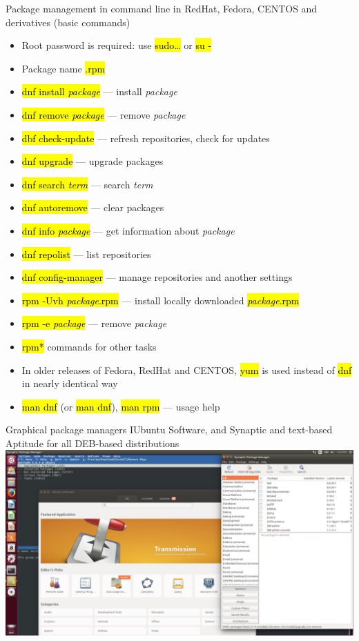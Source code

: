 \documentclass[compress, ucs, xelatex, 11pt, xcolor=svgnames,
  hyperref={
    bookmarks=true,
    unicode=true,
    colorlinks=true,
    pdftitle={Linux, command line and MetaCentrum},
    plainpages=false,
    pdfauthor={Vojtech Zeisek},
    pdfsubject={Course about use of Linux command line, writing shell scripts and using MetaCentrum of CESNET},
    pdfcreator={XeLaTeX},
    pdfkeywords={Linux, GNU, BASH, shell, command line, MetaCentrum},
    linkcolor=DarkRed,
    anchorcolor=DarkBlue,
    citecolor=Indigo,
    filecolor=NavyBlue,
    menucolor=DarkMagenta,
    urlcolor=DarkBlue,
    pdftex},
  url={hyphens, lowtilde} %
  ]{beamer}
\renewcommand{\texttt}[1]{\hl{\ttfamily #1}}
\begin{document}
\begin{frame}[allowframebreaks]{Package management in command line in RedHat, Fedora, CENTOS and derivatives (basic commands)}
  \begin{itemize}
    \item Root password is required: use \texttt{sudo\ldots} or \texttt{su -}
    \item Package name \texttt{*.rpm}
    \item \texttt{dnf install \textit{package}} --- install \textit{package}
    \item \texttt{dnf remove \textit{package}} --- remove \textit{package}
    \item \texttt{dbf check-update} --- refresh repositories, check for updates
    \item \texttt{dnf upgrade} --- upgrade packages
    \item \texttt{dnf search \textit{term}} --- search \textit{term}
    \item \texttt{dnf autoremove} --- clear packages
    \item \texttt{dnf info \textit{package}} --- get information about \textit{package}
    \item \texttt{dnf repolist} --- list repositories
    \item \texttt{dnf config-manager} --- manage repositories and another settings
    \item \texttt{rpm -Uvh \textit{package}.rpm} --- install locally downloaded \texttt{\textit{package}.rpm}
    \item \texttt{rpm -e \textit{package}} --- remove \textit{package}
    \item \texttt{rpm*} commands for other tasks
    \item In older releases of Fedora, RedHat and CENTOS, \texttt{yum} is used instead of \texttt{dnf} in nearly identical way
    \item \texttt{man dnf} (or \texttt{man dnf}), \texttt{man rpm} --- usage help
  \end{itemize}
\end{frame}

\begin{frame}{Graphical package managers I}{Ubuntu Software, and Synaptic and text-based Aptitude for all DEB-based distributions}
  \includegraphics[width=\textwidth]{software_managers_ubuntu_deb.png}
\end{frame}
\end{document}
